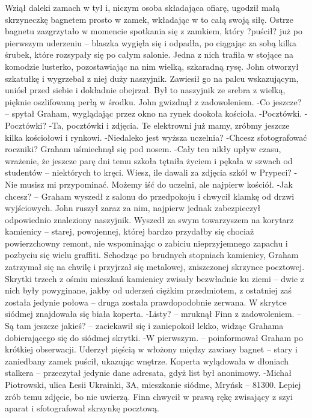 \documentclass[../MAIN.tex]{subfiles}
\begin{document}
Wziął daleki zamach w tył i, niczym osoba składająca ofiarę, ugodził małą skrzyneczkę bagnetem prosto w zamek, wkładając w to całą swoją siłę.
Ostrze bagnetu zazgrzytało w momencie spotkania się z zamkiem, który ?puścił? już po pierwszym uderzeniu -- blaszka wygięła się i odpadła, po ciągając za sobą kilka śrubek, które rozsypały się po całym salonie. Jedna z nich trafiła w stojące na komodzie lusterko, pozostawiając na nim wielką, szkaradną rysę.
John otworzył szkatułkę i wygrzebał z niej duży naszyjnik.
Zawiesił go na palcu wskazującym, uniósł przed siebie i dokładnie obejrzał. Był to naszyjnik ze srebra z wielką, pięknie oszlifowaną perłą w środku. John gwizdnął z zadowoleniem.
-Co jeszcze? -- spytał Graham, wyglądając przez okno na rynek dookoła kościoła.
-Pocztówki.
-Pocztówki?
-Ta, pocztówki i zdjęcia. Te elektrowni już mamy, zróbmy jeszcze kilka kościołowi i rynkowi.
-Niedaleko jest wyższa uczelnia?
-Chcesz sfotografować roczniki?
Graham uśmiechnął się pod nosem.
-Cały ten nikły upływ czasu, wrażenie, że jeszcze parę dni temu szkoła tętniła życiem i pękała w szwach od studentów -- niektórych to kręci. Wiesz, ile dawali za zdjęcia szkół w Prypeci?
-Nie musisz mi przypominać. Możemy iść do uczelni, ale najpierw kościół.
-Jak chcesz? -- Graham wyszedł z salonu do przedpokoju i chwycił klamkę od drzwi wyjściowych. John ruszył zaraz za nim, najpierw jednak zabezpieczył odpowiednio znaleziony naszyjnik. Wyszedł za swym towarzyszem na korytarz kamienicy -- starej, powojennej, której bardzo przydałby się chociaż powierzchowny remont, nie wspominając o zabiciu nieprzyjemnego zapachu i pozbyciu się wielu graffiti.
Schodząc po brudnych stopniach kamienicy, Graham zatrzymał się na chwilę i przyjrzał się metalowej, zniszczonej skrzynce pocztowej. Skrytki trzech z ośmiu mieszkań kamienicy zwisały bezwładnie ku ziemi -- dwie z nich były powyginane, jakby od uderzeń ciężkim przedmiotem, z ostatniej zaś została jedynie połowa -- druga została prawdopodobnie zerwana.
W skrytce siódmej znajdowała się biała koperta.
-Listy? -- mruknął Finn z zadowoleniem. -- Są tam jeszcze jakieś? -- zaciekawił się i zaniepokoił lekko, widząc Grahama dobierającego się do siódmej skrytki.
-W pierwszym. -- poinformował Graham po krótkiej obserwacji. Uderzył pięścią w włożony między zawiasy bagnet -- stary i zaniedbany zamek puścił, ukazując wnętrze. Koperta wylądowała w dłoniach stalkera -- przeczytał jedynie dane adresata, gdyż list był anonimowy.
-Michał Piotrowski, ulica Łesii Ukrainki, 3A, mieszkanie siódme, Mryńsk -- 81300. Lepiej zrób temu zdjęcie, bo nie uwierzą.
Finn chwycił w prawą rękę zwisający z szyi aparat i sfotografował skrzynkę pocztową.
\end{document}
